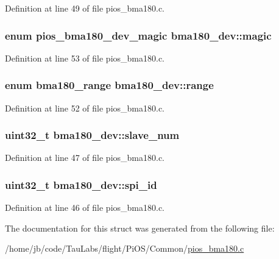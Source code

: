 \-Definition at line 49 of file pios\-\_\-bma180.\-c.

\hypertarget{structbma180__dev_ad45772028b3de22401b0bcf218c289e9}{
\subsubsection[{magic}]{\setlength{\rightskip}{0pt plus 5cm}enum {\bf pios\-\_\-bma180\-\_\-dev\-\_\-magic} {\bf bma180\-\_\-dev\-::magic}}}\label{structbma180__dev_ad45772028b3de22401b0bcf218c289e9}


\-Definition at line 53 of file pios\-\_\-bma180.\-c.

\hypertarget{structbma180__dev_a85103d7472326b03f89d2b658d56aecc}{
\subsubsection[{range}]{\setlength{\rightskip}{0pt plus 5cm}enum {\bf bma180\-\_\-range} {\bf bma180\-\_\-dev\-::range}}}\label{structbma180__dev_a85103d7472326b03f89d2b658d56aecc}


\-Definition at line 52 of file pios\-\_\-bma180.\-c.

\hypertarget{structbma180__dev_a9743ebc53aa6398ca08d7b796228b47c}{
\subsubsection[{slave\-\_\-num}]{\setlength{\rightskip}{0pt plus 5cm}uint32\-\_\-t {\bf bma180\-\_\-dev\-::slave\-\_\-num}}}\label{structbma180__dev_a9743ebc53aa6398ca08d7b796228b47c}


\-Definition at line 47 of file pios\-\_\-bma180.\-c.

\hypertarget{structbma180__dev_aa0e8c93b86245e1fd072692c70d8df2d}{
\subsubsection[{spi\-\_\-id}]{\setlength{\rightskip}{0pt plus 5cm}uint32\-\_\-t {\bf bma180\-\_\-dev\-::spi\-\_\-id}}}\label{structbma180__dev_aa0e8c93b86245e1fd072692c70d8df2d}


\-Definition at line 46 of file pios\-\_\-bma180.\-c.



\-The documentation for this struct was generated from the following file\-:\begin{DoxyCompactItemize}
\item 
/home/jb/code/\-Tau\-Labs/flight/\-Pi\-O\-S/\-Common/\hyperlink{pios__bma180_8c}{pios\-\_\-bma180.\-c}\end{DoxyCompactItemize}
